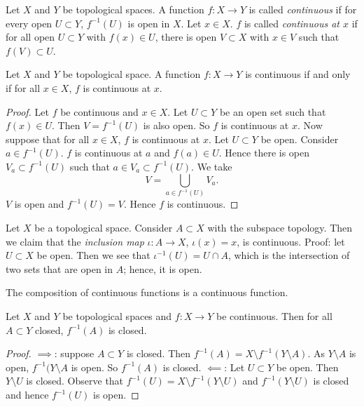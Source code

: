 

\begin{definition}[]
	Let $X$ and $Y$ be topological spaces.
	A function $f: X \to Y$ is called \emph{continuous} if for every open
	$U \subset Y$, $f^{-1}(U)$ is open in $X$.
	Let $x \in X$. $f$ is called \emph{continuous at $x$} if for all open
	$U \subset Y$ with $f(x) \in U$, there is open $V \subset X$ with $x \in V$
	such that $f(V) \subset U$.
\end{definition}

\begin{lemma}[]
	Let $X$ and $Y$ be topological space.
	A function $f: X \to Y$ is continuous if and only if for all $x \in X$,
	$f$ is continuous at $x$.
\end{lemma}

\begin{proof}
	Let $f$ be continuous and $x \in X$.
	Let $U \subset Y$ be an open set such that $f(x) \in U$.
	Then $V = f^{-1}(U)$ is also open.
	So $f$ is continuous at $x$.
	Now suppose that for all $x \in X$, $f$ is continuous at $x$.
	Let $U \subset Y$ be open.
	Consider $a \in f^{-1}(U)$.
	$f$ is continuous at $a$ and $f(a) \in U$.
	Hence there is open $V_a \subset f^{-1}(U)$ such that 
	$a \in V_a \subset f^{-1}(U)$.
	We take
	\[
		V = \bigcup_{a \in f^{-1}(U)} V_a.
	\]
	$V$ is open and $f^{-1}(U) = V$.
	Hence $f$ is continuous.
\end{proof}

\begin{example}[]
	Let $X$ be a topological space.
	Consider $A \subset X$ with the subspace topology.
	Then we claim that the \emph{inclusion map} $\iota: A \to X$,
	$\iota(x) = x$, is continuous.
	Proof: let $U \subset X$ be open.
	Then we see that $\iota^{-1}(U) = U \cap A$, which is the intersection of 
	two sets that are open in $A$; hence, it is open.
\end{example}

\begin{lemma}[]
	The composition of continuous functions is a continuous function.
\end{lemma}

\begin{lemma}[]
	Let $X$ and $Y$ be topological spaces and $f: X \to Y$ be continuous.
	Then for all $A \subset Y$ closed, $f^{-1}(A)$ is closed.
\end{lemma}

\begin{proof}
	$\implies$: suppose $A \subset Y$ is closed.
	Then $f^{-1}(A) = X \setminus f^{-1}(Y \setminus A)$.
	As $Y \setminus A$ is open, $f^{-1}(Y \setminus A$ is open.
	So $f^{-1}(A)$ is closed.
	$\impliedby$: Let $U \subset Y$ be open.
	Then $Y \setminus U$ is closed.
	Observe that $f^{-1}(U) = X \setminus f^{-1}(Y \setminus U)$ and 
	$f^{-1}(Y \setminus U)$ is closed and hence $f^{-1}(U)$ is open.
\end{proof}


